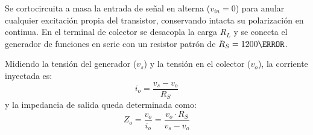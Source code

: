 Se cortocircuita a masa la entrada de señal en alterna ($v_{in} = 0$) para anular cualquier excitación propia del
transistor, conservando intacta su polarización en continua. En el terminal de colector se desacopla la carga $R_L$ y se
conecta el generador de funciones en serie con un resistor patrón de $R_S = 1200\ohm$.

Midiendo la tensión del generador ($v_s$) y la tensión en el colector ($v_o$), la corriente inyectada es:
\begin{equation}
  i_o = \frac{v_s - v_o}{R_S}
\end{equation}
y la impedancia de salida queda determinada como:
\begin{equation}
  Z_o = \frac{v_o}{i_o} = \frac{v_o \cdot R_S}{v_s - v_o}
  \label{eq:Zo_exp_formula}
\end{equation}
